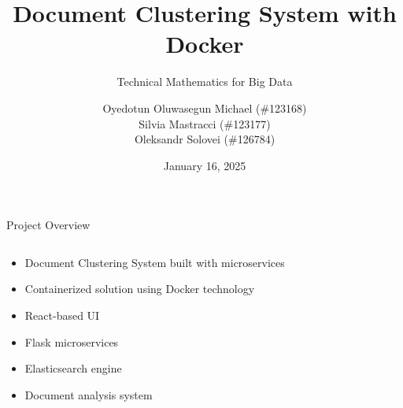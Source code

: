 \documentclass[notes]{beamer}
\title{Document Clustering System with Docker}
\subtitle{Technical Mathematics for Big Data}
\author{Oyedotun Oluwasegun Michael (\#123168) \\ Silvia Mastracci (\#123177) \\ Oleksandr Solovei (\#126784)}
\date{January 16, 2025}
\begin{document}
\begin{frame}
    \titlepage
\end{frame}

{
\begin{frame}{Project Overview}
  \begin{columns}[T] %
    \begin{column}{0.34\textwidth}
    \begin{itemize}
        \item Document Clustering System built with microservices
        \item Containerized solution using Docker technology
        \vspace{.5cm}
        \item React-based UI
        \item Flask microservices
        \item Elasticsearch engine
        \item Document analysis system
    \end{itemize}
    \end{column}
    \begin{column}{0.62\textwidth}
        \centering  %

\end{column}
\end{columns}
\end{frame}}
\end{document}
